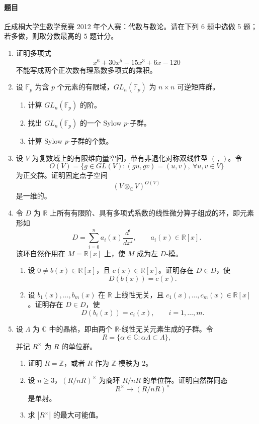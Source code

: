 \documentclass[UTF8,12pt]{ctexart}
\begin{document}
\paragraph{题目}
丘成桐大学生数学竞赛 2012 年个人赛：代数与数论。请在下列 6 题中选做 5 题；若多做，则取分数最高的 5 题计分。
\begin{enumerate}[label=\textbf{\arabic*.},leftmargin=2.2em]
\item 证明多项式
\[
x^6+30x^5-15x^3+6x-120
\]
不能写成两个正次数有理系数多项式的乘积。

\item 设 \(\mathbb F_p\) 为含 \(p\) 个元素的有限域，\(GL_n(\mathbb F_p)\) 为 \(n\times n\) 可逆矩阵群。
\begin{enumerate}[label=\textbf{(\arabic*)},leftmargin=2.4em]
\item 计算 \(GL_n(\mathbb F_p)\) 的阶。
\item 找出 \(GL_n(\mathbb F_p)\) 的一个 Sylow \(p\)-子群。
\item 计算 Sylow \(p\)-子群的个数。
\end{enumerate}

\item 设 \(V\) 为复数域上的有限维向量空间，带有非退化对称双线性型 \((\, ,\, )\)。令
\[
O(V)=\{g\in GL(V):(gu,gv)=(u,v),\ \forall u,v\in V\}
\]
为正交群。证明固定点子空间
\[
(V\otimes_{\mathbb C}V)^{O(V)}
\]
是一维的。

\item 令 \(D\) 为 \(\mathbb R\) 上所有有限阶、具有多项式系数的线性微分算子组成的环，即元素形如
\[
D=\sum_{i=0}^n a_i(x)\frac{d^i}{dx^i},
\qquad a_i(x)\in\mathbb R[x].
\]
该环自然作用在 \(M=\mathbb R[x]\) 上，使 \(M\) 成为左 \(D\)-模。
\begin{enumerate}[label=\textbf{(\arabic*)},leftmargin=2.4em]
\item 设 \(0\ne b(x)\in\mathbb R[x]\)，且 \(c(x)\in\mathbb R[x]\)。证明存在 \(D\in D\)，使
\[
D(b(x))=c(x).
\]
\item 设 \(b_1(x),\ldots,b_m(x)\) 在 \(\mathbb R\) 上线性无关，且 \(c_1(x),\ldots,c_m(x)\in\mathbb R[x]\)。证明存在 \(D\in D\)，使
\[
D(b_i(x))=c_i(x),\qquad i=1,\ldots,m.
\]
\end{enumerate}

\item 设 \(\Lambda\) 为 \(\mathbb C\) 中的晶格，即由两个 \(\mathbb R\)-线性无关元素生成的子群。令
\[
R=\{\alpha\in\mathbb C:\alpha\Lambda\subset\Lambda\},
\]
并记 \(R^\times\) 为 \(R\) 的单位群。
\begin{enumerate}[label=\textbf{(\arabic*)},leftmargin=2.4em]
\item 证明 \(R=\mathbb Z\)，或者 \(R\) 作为 \(\mathbb Z\)-模秩为 \(2\)。
\item 设 \(n\ge3\)，\((R/nR)^\times\) 为商环 \(R/nR\) 的单位群。证明自然群同态
\[
R^\times\longrightarrow (R/nR)^\times
\]
是单射。
\item 求 \(|R^\times|\) 的最大可能值。
\end{enumerate}


\end{enumerate}
\end{document}
